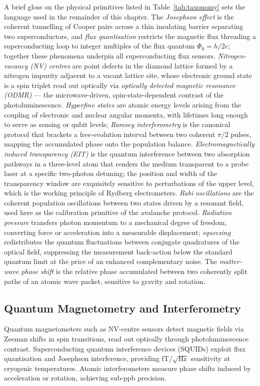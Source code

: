 A brief gloss on the physical primitives listed in Table~\ref{tab:taxonomy} sets the language used in the remainder of this chapter. The \emph{Josephson effect} is the coherent tunnelling of Cooper pairs across a thin insulating barrier separating two superconductors, and \emph{flux quantisation} restricts the magnetic flux threading a superconducting loop to integer multiples of the flux quantum $\Phi_0 = h/2e$; together these phenomena underpin all superconducting flux sensors. \emph{Nitrogen-vacancy (NV) centres} are point defects in the diamond lattice formed by a nitrogen impurity adjacent to a vacant lattice site, whose electronic ground state is a spin triplet read out optically via \emph{optically detected magnetic resonance (ODMR)} --- the microwave-driven, spin-state-dependent contrast of the photoluminescence. \emph{Hyperfine states} are atomic energy levels arising from the coupling of electronic and nuclear angular momenta, with lifetimes long enough to serve as sensing or qubit levels; \emph{Ramsey interferometry} is the canonical protocol that brackets a free-evolution interval between two coherent $\pi/2$ pulses, mapping the accumulated phase onto the population balance. \emph{Electromagnetically induced transparency (EIT)} is the quantum interference between two absorption pathways in a three-level atom that renders the medium transparent to a probe laser at a specific two-photon detuning; the position and width of the transparency window are exquisitely sensitive to perturbations of the upper level, which is the working principle of Rydberg electrometers. \emph{Rabi oscillations} are the coherent population oscillations between two states driven by a resonant field, used here as the calibration primitive of the avalanche protocol. \emph{Radiation pressure} transfers photon momentum to a mechanical degree of freedom, converting force or acceleration into a measurable displacement; \emph{squeezing} redistributes the quantum fluctuations between conjugate quadratures of the optical field, suppressing the measurement back-action below the standard quantum limit at the price of an enhanced complementary noise. The \emph{matter-wave phase shift} is the relative phase accumulated between two coherently split paths of an atomic wave packet, sensitive to gravity and rotation.

\subsection*{Quantum Magnetometry and Interferometry}
Quantum magnetometers such as NV-centre sensors detect magnetic fields via Zeeman shifts in spin transitions, read out optically through photoluminescence contrast. Superconducting quantum interference devices (SQUIDs) exploit flux quantisation and Josephson interference, providing fT/$\sqrt{\text{Hz}}$ sensitivity at cryogenic temperatures. Atomic interferometers measure phase shifts induced by acceleration or rotation, achieving sub-ppb precision.

